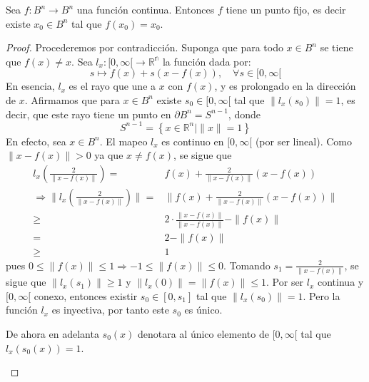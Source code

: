 \documentclass[12pt]{report}
\theoremstyle{largebreak}
\newcommand\cf[3]{\ensuremath{#1:#2\rightarrow#3}}
\begin{document}
\begin{theor}
    Sea $\cf{f}{B^n}{B^n}$ una función continua. Entonces $f$ tiene un punto fijo, es decir existe $x_0\in B^n$ tal que $f(x_0)=x_0$.
\end{theor}

\begin{proof}
    Procederemos por contradicción. Suponga que para todo $x\in B^n$ se tiene que $f(x)\neq x$. Sea $\cf{l_x}{[0,\infty[}{\mathbb{R^n}}$ la función dada por:
    \begin{equation*}
        s\mapsto f(x)+s\left(x-f(x)\right),\quad \forall s\in[0,\infty[
    \end{equation*}
    En esencia, $l_x$ es el rayo que une a $x$ con $f(x)$, y es prolongado en la dirección de $x$. Afirmamos que para $x\in B^n$ existe $s_0\in[0,\infty[$ tal que $\|l_x(s_0)\|=1$, es decir, que este rayo tiene un punto en $\partial B^n=S^{n-1}$, donde
    \begin{equation*}
        S^{n-1}=\left\{x\in\mathbb{R}^n|\|x\|=1\right\}
    \end{equation*}
    En efecto, sea $x\in B^n$. El mapeo $l_x$ es continuo en $[0,\infty[$ (por ser lineal). Como $\|x-f(x)\|>0$ ya que $x\neq f(x)$, se sigue que
    \begin{equation*}
        \begin{split}
            l_x(\frac{2}{\|x-f(x)\|})=&f(x)+\frac{2}{\|x-f(x)\|}\left(x-f(x)\right)\\
            \Rightarrow \|l_x(\frac{2}{\|x-f(x)\|})\|=&\|f(x)+\frac{2}{\|x-f(x)\|}\left(x-f(x)\right)\|\\
            \geq& 2\cdot\frac{\|x-f(x)\|}{\|x-f(x)\|}-\|f(x)\|\\
            =&2-\|f(x)\|\\
            \geq&1
        \end{split}
    \end{equation*}
    pues $0\leq \|f(x)\|\leq 1 \Rightarrow -1\leq \|f(x)\|\leq 0$. Tomando $s_1=\frac{2}{\|x-f(x)\|}$, se sigue que $\|l_x(s_1)\|\geq 1$ y $\|l_x(0)\|=\|f(x)\|\leq 1$. Por ser $l_x$ continua y $[0,\infty[$ conexo, entonces existir $s_0\in[0,s_1]$ tal que $\|l_x(s_0)\|=1$. Pero la función $l_x$ es inyectiva, por tanto este $s_0$ es único.

    \begin{obs}
    De ahora en adelanta $s_0(x)$ denotara al único elemento de $[0,\infty[$ tal que $l_x(s_0(x))=1$.
    \end{obs}


\end{proof}
\end{document}
